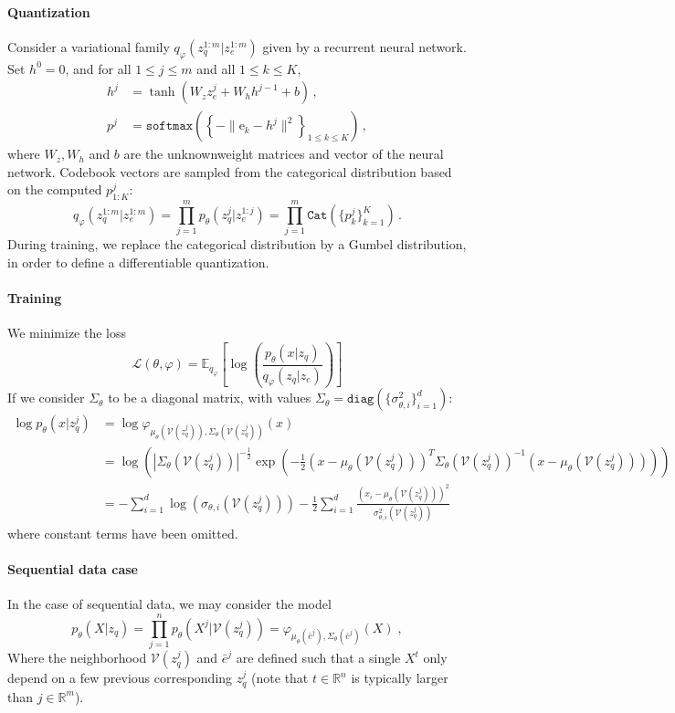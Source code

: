 \documentclass{article}
\newcommand{\rset}{\ensuremath{\mathbb{R}}}
\newcommand{\eqsp}{\;}
\newcommand{\rme}{\mathrm{e}}
\newcommand{\vois}{\mathcal{V}}
\begin{document}
\paragraph{Quantization} Consider a variational family $q_\varphi(z_q^{1:m}|z_e^{1:m})$ given by a recurrent neural network. Set $h^0 = 0$, and for all $1 \leq j \leq m$ and all $1 \leq k \leq K$,
\begin{align*}
    h^j &= \tanh(W_z z_e^j + W_h h^{j-1} + b)\,, \\
    p^j &= \texttt{softmax}\left(\left\{- \| \rme_k - h^j\|^2\right\}_{1\leqslant k \leqslant K}\right)\,,
\end{align*}
where $W_z, W_h$ and $b$ are the unknownweight matrices and vector of the neural network.
Codebook vectors are sampled  from the categorical distribution based on the computed $p^j_{1:K}$:
$$
q_\varphi(z_q^{1:m} | z_e^{1:m}) = \prod_{j=1}^m p_\theta(z_q^j|z_e^{1:j}) = \prod_{j=1}^m \texttt{Cat}(\{p^j_k\}_{k=1}^K)\,.
$$
During training, we replace the categorical distribution by a Gumbel distribution, in order to define a differentiable quantization.

\paragraph{Training}
We minimize the loss
$$
\mathcal{L}(\theta, \varphi) = \mathbb{E}_{q_\varphi} \left[ \log\left(\frac{p_\theta(x|z_q)}{q_\varphi(z_q|z_e)}\right) \right]
$$
If we consider $\Sigma_\theta$ to be a diagonal matrix, with values $\Sigma_\theta = \texttt{diag}(\{\sigma_{\theta, i}^2\}_{i=1}^d)$:
\begin{align*}
    \log p_\theta(x|z_q^j) &= \log \varphi_{\mu_\theta(\vois(z_q^j)),\Sigma_\theta(\vois(z_q^j))}(x) \\
			   &= \log\left(|\Sigma_\theta(\vois(z_q^j))|^{-\frac{1}{2}} \exp\left(-\frac{1}{2}(x - \mu_\theta(\vois(z_q^j)))^T \Sigma_\theta(\vois(z_q^j))^{-1} (x - \mu_\theta(\vois(z_q^j))) \right)\right) \\
			   &= -\sum_{i=1}^d \log(\sigma_{\theta, i}(\vois(z_q^j))) -\frac{1}{2} \sum_{i=1}^d \frac{(x_i - \mu_\theta(\vois(z_q^j)))^2}{\sigma_{\theta, i}^2(\vois(z_q^j))}
\end{align*}
where constant terms have been omitted.

\paragraph{Sequential data case}
In the case of sequential data, we may consider the model
$$
p_{\theta}(X|z_q) = \prod_{j=1}^n p_{\theta}(X^j|\vois(z_q^j)) = \varphi_{\mu_\theta(\bar e^j),\Sigma_\theta(\bar e^j)}(X)\eqsp,
$$
Where the neighborhood $\vois(z_q^j)$ and $\bar e^j$ are defined such that a single $X^t$ only depend on a few previous corresponding $z_q^j$ (note that $t \in \rset^n$ is typically larger than $j \in \rset^m$).
\end{document}
